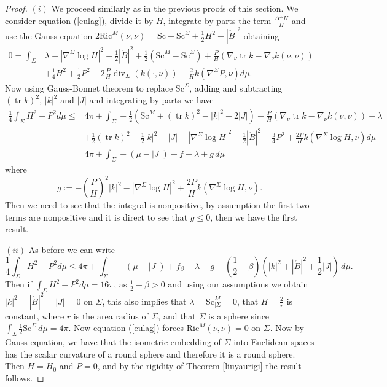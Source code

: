 \documentclass[12pt,a4paper]{amsart}
\theoremstyle{plain}
\theoremstyle{definition}
\newcommand{\diver}{\operatorname{div}}
\newcommand{\tr}{\operatorname{tr}}
\begin{document}
\begin{proof}
  $(i)$ We proceed similarly as in the previous proofs of this section. We consider  equation (\ref{eulag}), divide it by $H$, integrate by parts the term $\frac{\Delta^\Sigma H}{H}$ and use the Gauss equation $2\mathrm{Ric}^M(\nu, \nu) = \mathrm{Sc} -\mathrm{Sc}^{\Sigma}  + \frac{1}{2}H^2 - |\mathring{B}|^2    $ obtaining
\begin{equation}\label{argudyna}
\begin{split}
   0=  \int_{\Sigma}&\lambda+ |\nabla^\Sigma \log H|^2 + \frac{1}{2} |\mathring{B}|^2+  \frac{1}{2}(\mathrm{Sc}^M -\mathrm{Sc}^{\Sigma}) +\frac{P}{H}( \nabla_\nu \tr k - \nabla_\nu k(\nu,\nu ))\\& +\frac{1}{4}H^2 + \frac{1}{2} P^2 - 2\frac{P}{H} \diver_\Sigma (k(\cdot, \nu))- \frac{2}{H} k (\nabla^\Sigma P, \nu )d\mu. 
    \end{split}
\end{equation}
Now using  Gauss-Bonnet theorem to replace $ \mathrm{Sc}^{\Sigma}$, adding and subtracting $(\tr k)^2$, $|k|^2$ and $|J|$ and integrating by parts  we have 
\begin{equation*}\label{posirigiequ}
\begin{split}
    \frac{1}{4}\int_\Sigma H^2-P^2 d\mu \leq& 4\pi +\int_\Sigma -\frac{1}{2}(\mathrm{Sc}^M + (\tr k)^2 - |k|^2-2|J|)-\frac{P}{H}( \nabla_\nu \tr k - \nabla_\nu k(\nu,\nu )) -\lambda \\& +\frac{1}{2 }(\tr k)^2 - \frac{1}{2}|k|^2 -|J|  -|\nabla^\Sigma  \log H|^2 - \frac{1}{2} |\mathring{B}|^2  - \frac{3}{4} P^2 + \frac{2P}{H}  k(\nabla^\Sigma \log H, \nu)  d\mu\\
    =&4\pi +\int_\Sigma -(\mu-|J|) +f-\lambda+g\, d\mu
    \end{split}
\end{equation*}
where 
$$g:= -\left( \frac{P}{H}\right)^2|k|^2 -|\nabla^\Sigma  \log H|^2 + \frac{2P}{H}  k(\nabla^\Sigma \log H, \nu). $$
Then we need to see that the integral is nonpositive, by assumption the first two terms are nonpositive and it is direct to see that $g\leq 0$, then we have the first result.



$(ii)$ As before  we can write 
\begin{equation}
    \frac{1}{4}\int_\Sigma H^2-P^2 d\mu \leq 4\pi +\int_\Sigma -(\mu-|J|) +f_\beta-\lambda+g -(\frac{1}{2}-\beta) (|k|^2  + |\mathring{B}|^2+\frac{1}{2} |J|)  \,   d\mu.
\end{equation}
Then if $\int_\Sigma H^2-P^2 d\mu = 16\pi$, as $\frac{1}{2}-\beta> 0 $ and using  our assumptions  we obtain  $|k|^2=|\mathring{B}|^2=|J|=0 $ on $\Sigma$, this also implies that  $\lambda= \mathrm{Sc}^M_{| \Sigma} =0$,  that $H=\frac{2}{r}$ is constant, where $r$ is the area radius of $\Sigma$, and that $\Sigma$ is a sphere since $\int_{\Sigma } \frac{1}{2}\mathrm{Sc}^{\Sigma} \, d\mu = 4 \pi$.  Now equation (\ref{eulag}) forces $\mathrm{Ric}^M(\nu, \nu) =0$ on $\Sigma$. Now by Gauss equation, we have that the isometric embedding of $\Sigma$ into Euclidean spaces has the scalar curvature of a round sphere and therefore it is a round sphere. Then $H=H_0$ and $P=0$, and by the rigidity of Theorem \ref{liuyaurigi} the result follows.
\end{proof}
\end{document}
